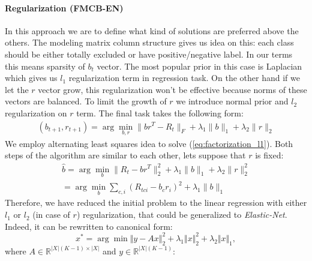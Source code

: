 \documentclass{article}
\begin{document}
\paragraph{Regularization (FMCB-EN)} %
\label{par:regularization}

In this approach we are to define what kind of solutions are preferred above the others. The modeling matrix column structure gives us idea on this: each class should be either totally excluded or have positive/negative label. In our terms this means sparsity of $b_t$ vector. The most popular prior in this case is Laplacian which gives us $l_1$ regularization term in regression task. On the other hand if we let the $r$ vector grow, this regularization won't be effective because norms of these vectors are balanced. To limit the growth of $r$ we introduce normal prior and $l_2$ regularization on $r$ term. The final task takes the following form:
\begin{multline}
(b_{t+1},r_{t+1}) = \arg \min_{b,r} \|b r^T - R_t\|_F + \lambda_1 \|b\|_1 + \lambda_2 \|r\|_2
\label{eq:factorization_l1}
\end{multline}
We employ alternating least squares idea to solve (\ref{eq:factorization_l1}). Both steps of the algorithm are similar to each other, lets suppose that $r$ is fixed:
\begin{multline*}
	\hat{b} = \arg\min_{b}\|R_t-br^T\|_2^{2} + \lambda_1 \|b\|_1 + \lambda_2 \|r\|_2^2 \\
	= \arg\min_{b}\sum_{c,i}\left(R_{tci}-b_cr_i\right)^{2} + \lambda_1 \|b\|_1
	\label{eq:elastic-net-argmin}
\end{multline*}
Therefore, we have reduced the initial problem to the linear regression with either $l_1$ or $l_2$ (in case of $r$) regularization, that could be generalized to \emph{Elastic-Net}. Indeed, it can be rewritten to canonical form:
 \begin{equation*}
x^{*}=\arg\min\Vert y-Ax\Vert_{2}^{2}+\lambda_{1}\Vert x\Vert_{2}^{2}+\lambda_{2}\Vert x\Vert_{1},\label{eq:elastic-net-canon-argmin}
\end{equation*}
where $A \in \mathbb{R}^{|X|(K-1)\times |X|}$ and $y \in \mathbb{R}^{|X|(K-1)}$:
\end{document}

